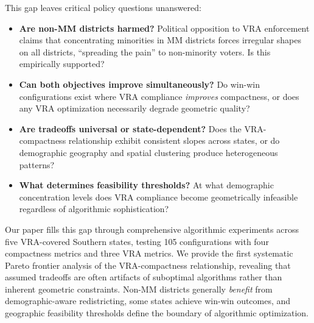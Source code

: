 This gap leaves critical policy questions unanswered:
\begin{itemize}
    \item \textbf{Are non-MM districts harmed?} Political opposition to VRA enforcement claims that concentrating minorities in MM districts forces irregular shapes on all districts, ``spreading the pain'' to non-minority voters. Is this empirically supported?
    \item \textbf{Can both objectives improve simultaneously?} Do win-win configurations exist where VRA compliance \emph{improves} compactness, or does any VRA optimization necessarily degrade geometric quality?
    \item \textbf{Are tradeoffs universal or state-dependent?} Does the VRA-compactness relationship exhibit consistent slopes across states, or do demographic geography and spatial clustering produce heterogeneous patterns?
    \item \textbf{What determines feasibility thresholds?} At what demographic concentration levels does VRA compliance become geometrically infeasible regardless of algorithmic sophistication?
\end{itemize}

Our paper fills this gap through comprehensive algorithmic experiments across five VRA-covered Southern states, testing 105 configurations with four compactness metrics and three VRA metrics. We provide the first systematic Pareto frontier analysis of the VRA-compactness relationship, revealing that assumed tradeoffs are often artifacts of suboptimal algorithms rather than inherent geometric constraints. Non-MM districts generally \emph{benefit} from demographic-aware redistricting, some states achieve win-win outcomes, and geographic feasibility thresholds define the boundary of algorithmic optimization.
